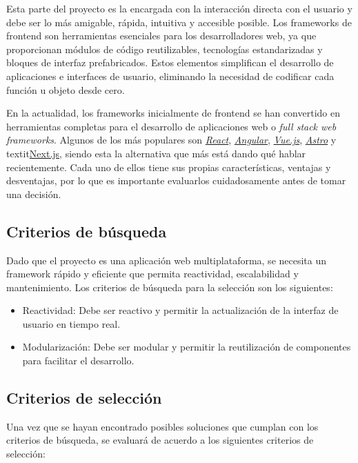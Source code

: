 Esta parte del proyecto es la encargada con la interacción directa con el usuario y debe ser lo más amigable, rápida, intuitiva y accesible posible. Los frameworks de frontend son herramientas esenciales para los desarrolladores web, ya que proporcionan módulos de código reutilizables, tecnologías estandarizadas y bloques de interfaz prefabricados. Estos elementos simplifican el desarrollo de aplicaciones e interfaces de usuario, eliminando la necesidad de codificar cada función u objeto desde cero.

En la actualidad, los frameworks inicialmente de frontend se han convertido en herramientas completas para el desarrollo de aplicaciones web o \textit{full stack web frameworks}. Algunos de los más populares son \textit{\href{https://es.react.dev/}{React}}, \textit{\href{https://angular.dev/}{Angular}}, \textit{\href{https://vuejs.org/}{Vue.js}}, \textit{\href{https://astro.build/}{Astro}} y textit{\href{https://nextjs.org/}{Next.js}}, siendo esta la alternativa que más está dando qué hablar recientemente. Cada uno de ellos tiene sus propias características, ventajas y desventajas, por lo que es importante evaluarlos cuidadosamente antes de tomar una decisión.

\subsection{Criterios de búsqueda}

Dado que el proyecto es una aplicación web multiplataforma, se necesita un framework rápido y eficiente que permita reactividad, escalabilidad y mantenimiento. Los criterios de búsqueda para la selección son los siguientes:

\begin{itemize}
    \item Reactividad: Debe ser reactivo y permitir la actualización de la interfaz de usuario en tiempo real.
    \item Modularización: Debe ser modular y permitir la reutilización de componentes para facilitar el desarrollo.
\end{itemize}

\subsection{Criterios de selección}

Una vez que se hayan encontrado posibles soluciones que cumplan con los criterios de búsqueda, se evaluará de acuerdo a los siguientes criterios de selección:

